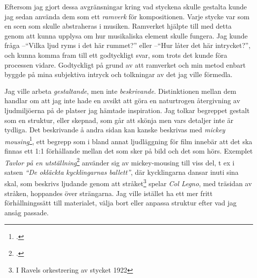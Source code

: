 \documentclass{article}
\begin{document}
Eftersom jag gjort dessa avgränsningar kring vad styckena skulle gestalta kunde jag sedan använda dem som ett
\emph{ramverk} för kompositionen. Varje stycke var som en scen som skulle abstraheras i musiken. Ramverket
hjälpte till med detta genom att kunna upplysa om hur musikaliska element skulle fungera. Jag kunde fråga 
--``Vilka ljud ryms i det här rummet?'' eller --``Hur låter det här intrycket?'', och kunna komma fram
till ett godtyckligt svar, som trots det kunde föra processen vidare. Godtyckligt på grund av att ramverket
och min metod enbart byggde på mina subjektiva intryck och tolkningar av det jag ville förmedla.


Jag ville arbeta \emph{gestaltande}, men inte \emph{beskrivande}. Distinktionen mellan dem handlar om att jag
inte hade en avsikt att göra en naturtrogen återgivning av ljudmiljöerna på de platser jag hämtade
inspiration. Jag tolkar begreppet gestalt som en struktur, eller skepnad, som går att skönja men vars detaljer
inte är tydliga. Det beskrivande å andra sidan kan kanske beskrivas med \emph{mickey
mousing}\footcite{mickeymouse}, ett begrepp som i
bland annat ljudläggning för film innebär att det ska finnas ett 1:1 förhållande mellan det som sker på bild och det som hörs. Exemplet \emph{Tavlor på en utställning}\footcite{Tavlor} använder sig av mickey-mousing till
viss del, t ex i satsen \emph{``De okläckta kycklingarnas ballett''}, där kycklingarna dansar inuti sina skal,
som beskrivs ljudande genom att stråket\footnote{I Ravels orkestrering av stycket 1922} spelar \emph{Col
Legno}, med träsidan av stråken, hoppandes över strängarna. Jag ville istället ha ett mer fritt
förhållningssätt till materialet, välja bort eller anpassa struktur efter vad jag ansåg passade.
\end{document}
